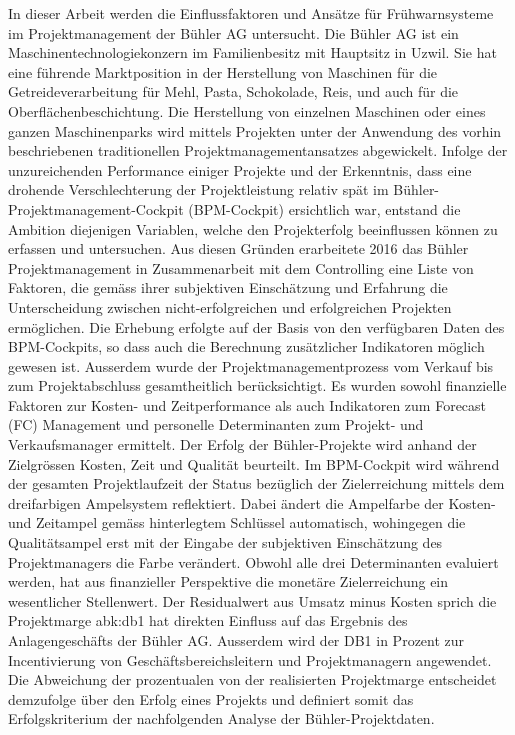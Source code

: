 \newline\newline
In dieser Arbeit werden die Einflussfaktoren und Ansätze für Frühwarnsysteme im Projektmanagement der Bühler AG untersucht. Die Bühler AG ist ein Maschinentechnologiekonzern im Familienbesitz mit Hauptsitz in Uzwil. Sie hat eine führende Marktposition in der Herstellung von Maschinen für die Getreideverarbeitung für Mehl, Pasta, Schokolade, Reis, und auch für die Oberflächenbeschichtung. Die Herstellung von einzelnen Maschinen oder eines ganzen Maschinenparks wird mittels Projekten unter der Anwendung des vorhin beschriebenen traditionellen Projektmanagementansatzes abgewickelt. Infolge der unzureichenden Performance einiger Projekte und der Erkenntnis, dass eine drohende Verschlechterung der Projektleistung relativ spät im Bühler-Projektmanagement-Cockpit (BPM-Cockpit) ersichtlich war, entstand die Ambition diejenigen Variablen, welche den Projekterfolg beeinflussen können zu erfassen und untersuchen. Aus diesen Gründen erarbeitete 2016 das Bühler Projektmanagement in Zusammenarbeit mit dem Controlling eine Liste von Faktoren, die gemäss ihrer subjektiven Einschätzung und Erfahrung die Unterscheidung zwischen nicht-erfolgreichen und erfolgreichen Projekten ermöglichen. Die Erhebung erfolgte auf der Basis von den verfügbaren Daten des BPM-Cockpits, so dass auch die Berechnung zusätzlicher Indikatoren möglich gewesen ist. Ausserdem wurde der Projektmanagementprozess vom Verkauf bis zum Projektabschluss gesamtheitlich berücksichtigt. Es wurden sowohl finanzielle Faktoren zur Kosten- und Zeitperformance als auch Indikatoren zum Forecast (FC) Management und personelle Determinanten zum Projekt- und Verkaufsmanager ermittelt. Der Erfolg der Bühler-Projekte wird anhand der Zielgrössen Kosten, Zeit und Qualität beurteilt. Im BPM-Cockpit wird während der gesamten Projektlaufzeit der Status bezüglich der Zielerreichung mittels dem dreifarbigen Ampelsystem reflektiert. Dabei ändert die Ampelfarbe der Kosten- und Zeitampel gemäss hinterlegtem Schlüssel automatisch, wohingegen die Qualitätsampel erst mit der Eingabe der subjektiven Einschätzung des Projektmanagers die Farbe verändert. Obwohl alle drei Determinanten evaluiert werden, hat aus finanzieller Perspektive  die monetäre Zielerreichung ein wesentlicher Stellenwert. Der Residualwert aus Umsatz minus Kosten sprich die Projektmarge \gls{abk:db1} hat direkten Einfluss auf das Ergebnis des Anlagengeschäfts der Bühler AG. Ausserdem wird der DB1 in Prozent zur Incentivierung von Geschäftsbereichsleitern und Projektmanagern angewendet. Die Abweichung der prozentualen von der realisierten Projektmarge entscheidet demzufolge über den Erfolg eines Projekts und definiert somit das Erfolgskriterium der nachfolgenden Analyse der Bühler-Projektdaten.  
